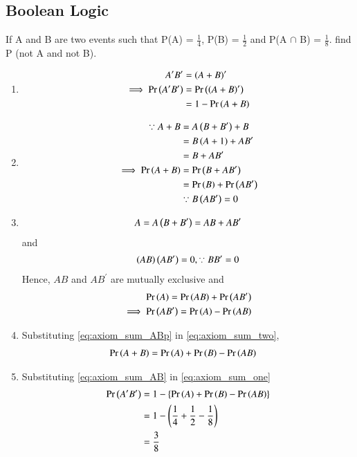 \subsection{Boolean Logic}
If A and B are two events such that P(A) = $\frac{1}{4}$, P(B) = $\frac{1}{2}$ and P(A $\cap$ B) = $\frac{1}{8}$. find P (not A and not B).
\renewcommand{\theequation}{\theenumi}
\begin{enumerate}[label=\thesubsection.\arabic*.,ref=\thesubsection.\theenumi]

\item 
\begin{align}
A^{\prime}B^{\prime} &=  \left(A+B\right)^{\prime}
\\
\implies \Pr\left(A^{\prime}B^{\prime}\right) &=  \Pr\left(\left(A+B\right)^{\prime}\right) 
\\
&= 1 - \Pr\left(A+B\right) 
\label{eq:axiom_sum_one}
\end{align}
\item 
\begin{align}
\because A+B &= A\left(B+B^{\prime}\right) + B
\\
&= B \left(A +1\right) + A B^{\prime}
\\
&=B + A B^{\prime}
\\
\implies \Pr\left(A+B\right) &= \Pr\left(B + A B^{\prime} \right)
\\
&=\Pr\left(B\right)+\Pr\left( A B^{\prime} \right) 
\\
&\because B \left( A B^{\prime} \right) = 0
\label{eq:axiom_sum_two}
\end{align}
\item 
\begin{align}
A = A \left(B+B^{\prime}\right) =  AB + AB^{\prime}
\label{eq:axiom_sum_A}
\end{align}
and 
\begin{align}
\left( AB\right)\left(  AB^{\prime}\right) = 0, \because BB^{\prime} = 0
\label{eq:axiom_sum_AB0}
\end{align}
Hence, $AB$ and $AB^{\prime}$ are mutually exclusive and 
%
\begin{align}
\Pr\left(A\right) = \Pr\left(AB\right) + \Pr\left(AB^{\prime}\right)
\\
\implies 
\Pr\left(AB^{\prime}\right) =  \Pr\left(A\right) - \Pr\left(AB\right)
\label{eq:axiom_sum_ABp}
\end{align}
\item Substituting \eqref{eq:axiom_sum_ABp} in \eqref{eq:axiom_sum_two}, 
\begin{align}
\Pr\left(A+B\right) &= \Pr\left(A\right) + \Pr\left(B\right) - \Pr\left(AB\right) 
\label{eq:axiom_sum_AB}
\end{align}
\item Substituting \eqref{eq:axiom_sum_AB} in \eqref{eq:axiom_sum_one}
\begin{align}
\Pr\left(A^{\prime}B^{\prime}\right) &=  1 - \left\{\Pr\left(A\right) + \Pr\left(B\right) - \Pr\left(AB\right) \right\}
\\
&= 1 - \left(\frac{1}{4} + \frac{1}{2} - \frac{1}{8}\right)
\\
&= \frac{3}{8}
\label{eq:axiom_sum_final}
\end{align}
\end{enumerate}
